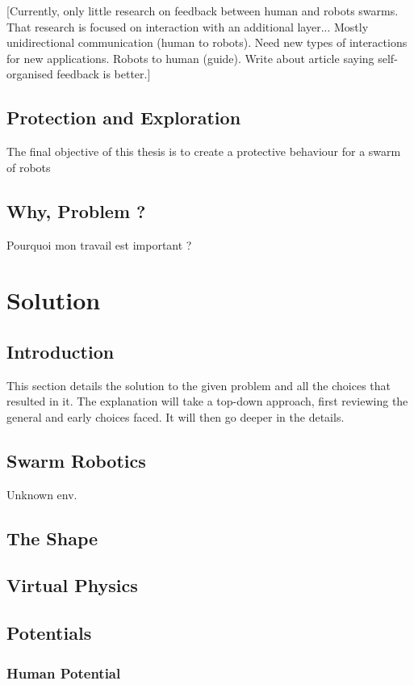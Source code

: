 \documentclass[a4paper, 12pt]{report}
\begin{document}
[Currently, only little research on feedback between human and robots swarms. That research is focused on interaction with an additional layer... Mostly unidirectional communication (human to robots). Need new types of interactions for new applications. Robots to human (guide). Write about article saying self-organised feedback is better.]



	\section{Protection and Exploration}
	
	The final objective of this thesis is to create a protective behaviour for a swarm of robots
	\section{Why, Problem ?}
	
	Pourquoi mon travail est important ?

\chapter{Solution}

	\section{Introduction}
	
	This section details the solution to the given problem and all the choices that resulted in it. The explanation will take a top-down approach, first reviewing the general and early choices faced. It will then go deeper in the details.
	
	\section{Swarm Robotics}
	
	Unknown env.
	\section{The Shape}
	\section{Virtual Physics}
	\section{Potentials}
		\subsection{Human Potential}
\end{document}
